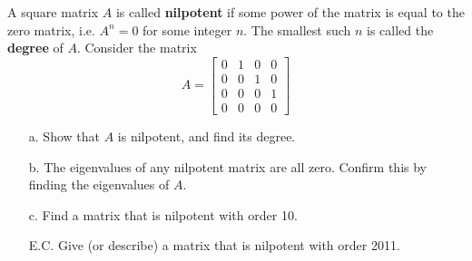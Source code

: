 {A square matrix $A$ is called {\bf nilpotent} if some power of the matrix is equal to the zero matrix, i.e. $A^n=0$ for some integer $n$.  The smallest such $n$ is called the {\bf degree} of $A$.  Consider the matrix 
\[
A
=
\left[
\begin{array}{cccc}
0 & 1 & 0&0\\
0 & 0 & 1 &0\\ 
0 & 0 &  0 & 1\\
0 & 0 & 0 & 0
\end{array}
\right]
\]
\begin{enumerate}
\item[a.] Show that $A$ is nilpotent, and find its degree.
\item[b.] The eigenvalues of any nilpotent matrix are all zero.  Confirm this by finding the eigenvalues of $A$.
\item[c.] Find a matrix that is nilpotent with order 10.
\item[E.C.] Give (or describe) a matrix that is nilpotent with order 2011.

\end{enumerate}
}
{}